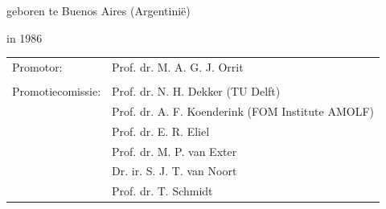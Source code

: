 \begin{titlepage}
\begin{center}
\bigskip
\bigskip

geboren te Buenos Aires (Argentini\"{e})

in 1986

\vspace*{2\bigskipamount}

\end{center}

\clearpage
\thispagestyle{empty}


\medskip\noindent
\begin{tabular}{ll}
    Promotor: & Prof. dr. M. A. G. J. Orrit \\
    & \\
    Promotiecomissie: & Prof. dr. N. H. Dekker (TU Delft)\\
    &	Prof. dr. A. F. Koenderink (FOM Institute AMOLF)\\
    &	Prof. dr. E. R. Eliel \\
    &	Prof. dr. M. P. van Exter \\
    &   Dr. ir. S. J. T. van Noort \\
    &	Prof. dr. T. Schmidt
\end{tabular}


\medskip



\end{titlepage}
